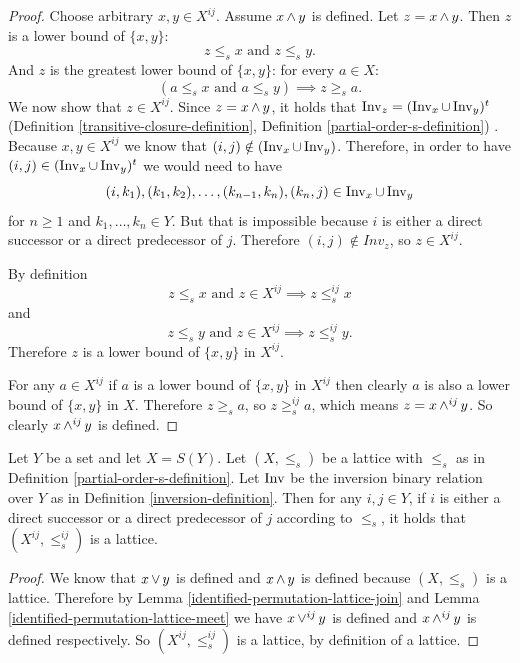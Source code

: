 	\begin{proof}
		Choose arbitrary $x, y \in X^{ij}$. Assume $x \operatorname{\wedge} y$ is defined. Let $z = x \operatorname{\wedge} y$. Then $z$ is a lower bound of $\{x, y\}$:
		\[
			z \le_s x \textrm{ and } z \le_s y.
		\]
		And $z$ is the greatest lower bound of $\{x, y\}$: for every $a \in X$:
		\[
			(a \le_s x \textrm{ and } a \le_s y) \implies z \ge_s a.
		\]
		We now show that $z \in X^{ij}$. Since $z = x \operatorname{\wedge} y$, it holds that $\operatorname{Inv}_z = (\operatorname{Inv}_x \cup \operatorname{Inv}_y)^t$ (Definition \ref{transitive-closure-definition}, Definition \ref{partial-order-s-definition}) \cite{markowsky1994permutation}. Because $x,y \in X^{ij}$ we know that $(i, j) \notin (\operatorname{Inv}_x \cup \operatorname{Inv}_y)$. Therefore, in order to have $(i, j) \in (\operatorname{Inv}_x \cup \operatorname{Inv}_y)^t$ we would need to have
		\[
			(i, k_1), (k_1, k_2), \ldots, (k_{n-1}, k_{n}), (k_{n}, j) \in \operatorname{Inv}_x \cup \operatorname{Inv}_y
		\]
		for $n \ge 1$ and $k_1, \ldots, k_n \in Y$. But that is impossible because $i$ is either a direct successor or a direct predecessor of $j$. Therefore $(i, j) \notin Inv_z$, so $z \in X^{ij}$.

		By definition
		\[
			z \le_s x \textrm{ and } z \in X^{ij} \implies z \le^{ij}_s x
		\]
		and
		\[
			z \le_s y \textrm{ and } z \in X^{ij} \implies z \le^{ij}_s y.
		\]
		Therefore $z$ is a lower bound of $\{x, y\}$ in $X^{ij}$.

		For any $a \in X^{ij}$ if $a$ is a lower bound of $\{x, y\}$ in $X^{ij}$ then clearly $a$ is also a lower bound of $\{x, y\}$ in $X$. Therefore $z \ge_s a$, so $z \ge^{ij}_s a$, which means $z = x \operatorname{\wedge}^{ij} y$. So clearly $x \operatorname{\wedge}^{ij} y$ is defined.
	\end{proof}

	\begin{theorem}
		\label{theorem-identification-is-lattice}
		Let $Y$ be a set and let $X = S(Y)$. Let $(X, \le_s)$ be a lattice with $\le_s$ as in Definition \ref{partial-order-s-definition}. Let $\operatorname{Inv}$ be the inversion binary relation over $Y$ as in Definition \ref{inversion-definition}. Then for any $i,j \in Y$, if $i$ is either a direct successor or a direct predecessor of $j$ according to $\le_s$, it holds that $(X^{ij}, \le^{ij}_s)$ is a lattice.
	\end{theorem}

	\begin{proof}
		We know that $x \operatorname{\vee} y$ is defined and $x \operatorname{\wedge} y$ is defined because $(X, \le_s)$ is a lattice. Therefore by Lemma \ref{identified-permutation-lattice-join} and Lemma \ref{identified-permutation-lattice-meet} we have $x \operatorname{\vee}^{ij} y$ is defined and $x \operatorname{\wedge}^{ij} y$ is defined respectively. So $(X^{ij}, \le^{ij}_s)$ is a lattice, by definition of a lattice.
	\end{proof}

